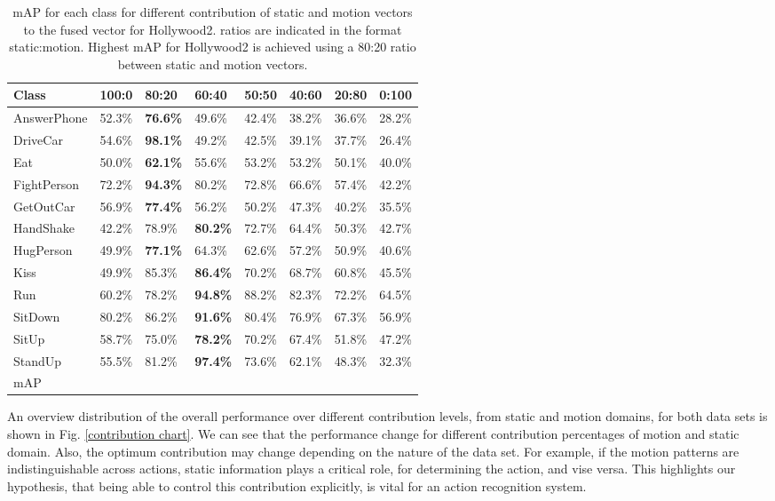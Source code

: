 \begin{table*}[]
\centering
\caption{mAP for each class for different contribution of static and motion vectors to the fused vector for Hollywood2. ratios are indicated in the
format static:motion. Highest mAP for Hollywood2 is achieved using a
80:20 ratio between static and motion vectors.}\label{tbl:rho hollywood2}
\begin{tabular}{|l||l|l|l|l|l|l|l|}
\hline
Class           & 100:0 & 80:20 & 60:40 & 50:50 & 40:60 & 20:80 & 0:100 \\ \hline \hline
AnswerPhone     & 52.3\%& \textbf{76.6\%}& 49.6\%& 42.4\%& 38.2\%& 36.6\%& 28.2\%        \\
DriveCar        & 54.6\%& \textbf{98.1\%}& 49.2\%& 42.5\%& 39.1\%& 37.7\%& 26.4\%            \\
Eat             & 50.0\%& \textbf{62.1\%}& 55.6\%& 53.2\%& 53.2\%& 50.1\%& 40.0\%           \\
FightPerson     & 72.2\%& \textbf{94.3\%}& 80.2\%& 72.8\%& 66.6\%& 57.4\%& 42.2\%  \\
GetOutCar       & 56.9\%& \textbf{77.4\%}& 56.2\%& 50.2\%& 47.3\%& 40.2\%& 35.5\%\\
HandShake       & 42.2\%& 78.9\%& \textbf{80.2\%}& 72.7\%& 64.4\%& 50.3\%& 42.7\% \\
HugPerson       & 49.9\%& \textbf{77.1\%}& 64.3\%& 62.6\%& 57.2\%& 50.9\%& 40.6\% \\
Kiss            & 49.9\%& 85.3\%& \textbf{86.4\%}& 70.2\%& 68.7\%& 60.8\%& 45.5\% \\
Run             & 60.2\%& 78.2\%& \textbf{94.8\%}& 88.2\%& 82.3\%& 72.2\%& 64.5\%  \\
SitDown         & 80.2\%& 86.2\%& \textbf{91.6\%}& 80.4\%& 76.9\%& 67.3\%& 56.9\%  \\
SitUp           & 58.7\%& 75.0\%& \textbf{78.2\%}& 70.2\%& 67.4\%& 51.8\%& 47.2\% \\
StandUp         & 55.5\%& 81.2\%& \textbf{97.4\%}& 73.6\%& 62.1\%& 48.3\%& 32.3\% \\ \hline
mAP             &       &       &       &       &       &       & \\ \hline

\end{tabular}
\end{table*}

An overview distribution of the overall performance over different contribution levels, from static and motion domains, for both data sets is shown in Fig. \ref{contribution chart}.
We can see that the performance change for different contribution percentages of motion and static domain. Also, the optimum contribution may change
depending on the nature of the data set. For example, if the motion patterns are indistinguishable across actions, static information plays
a critical role, for determining the action, and vise versa. This highlights
our hypothesis, that being able to control this contribution explicitly, is vital for an action recognition system.


